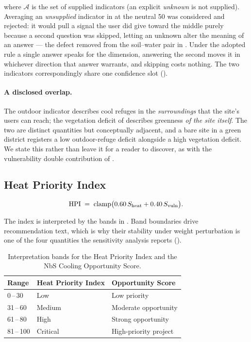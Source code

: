 where $\mathcal{A}$ is the set of supplied indicators (an explicit
\emph{unknown} is not supplied). Averaging an \emph{unsupplied} indicator in at
the neutral \num{50} was considered and rejected: it would pull a signal the
user did give toward the middle purely because a second question was skipped,
letting an unknown alter the meaning of an answer --- the defect removed from
the soil--water pair in . Under the adopted rule a single
answer speaks for the dimension, answering the second moves it in whichever
direction that answer warrants, and skipping costs nothing. The two indicators
correspondingly share one confidence slot ().

\paragraph{A disclosed overlap.} The outdoor indicator describes cool refuges
in the \emph{surroundings} that the site's users can reach; the vegetation
deficit of  describes greenness \emph{of the site
itself}. The two are distinct quantities but conceptually adjacent, and a bare
site in a green district registers a low outdoor-refuge deficit alongside a
high vegetation deficit. We state this rather than leave it for a reader to
discover, as with the vulnerability double contribution of
.

\subsection{Heat Priority Index}
\label{sec:hpi}

\begin{equation}
\label{eq:hpi}
\mathrm{HPI} \;=\; \operatorname{clamp}\bigl(0.60\,S_{\mathrm{heat}} + 0.40\,S_{\mathrm{vuln}}\bigr).
\end{equation}

The index is interpreted by the bands in . Band boundaries
drive recommendation text, which is why their stability under weight
perturbation is one of the four quantities the sensitivity analysis reports
().

\begin{table}[H]
\centering
\caption{Interpretation bands for the Heat Priority Index and the NbS Cooling
Opportunity Score.}
\label{tab:hpi-bands}
\small
\begin{tabular}{@{}lll@{}}
\toprule
\textbf{Range} & \textbf{Heat Priority Index} & \textbf{Opportunity Score} \\
\midrule
0\,--\,30   & Low      & Low priority \\
31\,--\,60  & Medium   & Moderate opportunity \\
61\,--\,80  & High     & Strong opportunity \\
81\,--\,100 & Critical & High-priority project \\
\bottomrule
\end{tabular}
\end{table}

